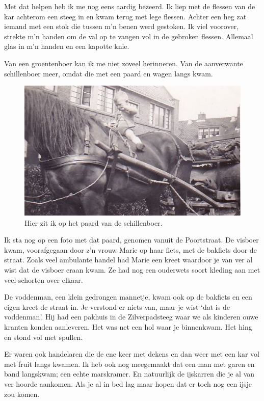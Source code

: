 \documentclass[12pt,twoside, openright]{memoir}
\begin{document}
 

Met dat helpen heb ik me nog eens aardig bezeerd. Ik liep met de flessen van de kar achterom een steeg in en kwam terug met lege flessen. Achter een heg zat iemand met een stok die tussen m’n benen werd gestoken. Ik viel voorover, strekte m'n handen om de val op te vangen vol in de gebroken flessen. Allemaal glas in m'n handen en een kapotte knie.

Van een groentenboer kan ik me niet zoveel herinneren. Van de aanverwante schillenboer meer, omdat die met een paard en wagen langs kwam. 

\begin{figure}
\centering
\includegraphics[width=\textwidth]{img/63schillenboer}
\caption*{\footnotesize Hier zit ik op het paard van de schillenboer.}
\end{figure}

Ik sta nog op een foto met dat paard, genomen vanuit de Poortstraat. De visboer kwam, voorafgegaan door z’n vrouw Marie op haar fiets, met de bakfiets door de straat. Zoals veel ambulante handel had Marie een kreet waardoor je van ver al wist dat de visboer eraan kwam. Ze had nog een ouderwets soort kleding aan met veel schorten over elkaar.

De voddenman, een klein gedrongen mannetje, kwam ook op de bakfiets en een eigen kreet de straat in. Je verstond er niets van, maar je wist `dat is de voddenman’. Hij had een pakhuis in de Zilverpadsteeg waar we als kinderen ouwe kranten konden aanleveren. Het was net een hol waar je binnenkwam. Het hing en stond vol met spullen. 

Er waren ook handelaren die de ene keer met dekens en dan weer met een kar vol met fruit langs kwamen. Ik heb ook nog meegemaakt dat een man met garen en band langskwam; een echte marskramer. En natuurlijk de ijskarren die je al van ver hoorde aankomen. Als je al in bed lag maar hopen dat er toch nog een ijsje zou komen.
\end{document}
